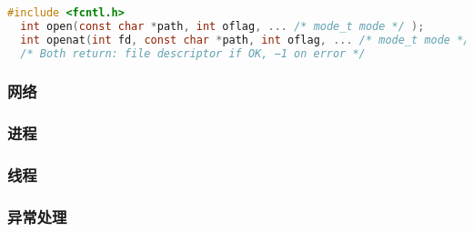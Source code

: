 \begin{lstlisting}[language=C]
  #include <fcntl.h>
  int open(const char *path, int oflag, ... /* mode_t mode */ );
  int openat(int fd, const char *path, int oflag, ... /* mode_t mode */ );
  /* Both return: file descriptor if OK, −1 on error */
\end{lstlisting}

\subsubsection{网络}
\subsubsection{进程}
\subsubsection{线程}
\subsubsection{异常处理}

